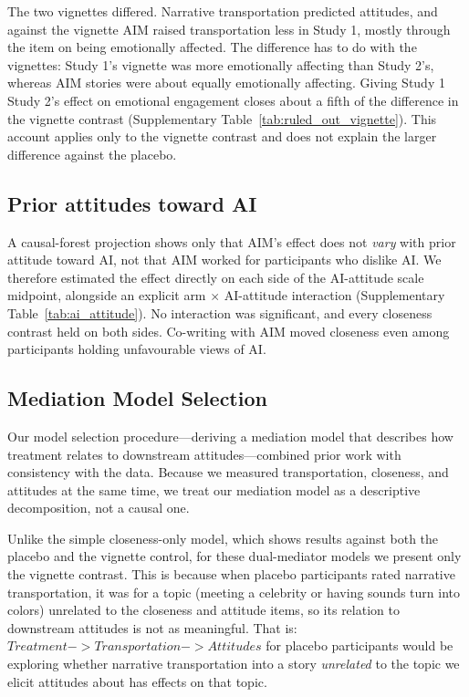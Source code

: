 \documentclass[11pt]{article}
\begin{document}
The two vignettes differed. Narrative transportation predicted attitudes, and against the vignette AIM raised transportation less in Study 1, mostly through the item on being emotionally affected. The difference has to do with the vignettes: Study 1's vignette was more emotionally affecting than Study 2's, whereas AIM stories were about equally emotionally affecting. Giving Study 1 Study 2's effect on emotional engagement closes about a fifth of the difference in the vignette contrast (Supplementary Table~\ref{tab:ruled_out_vignette}). This account applies only to the vignette contrast and does not explain the larger difference against the placebo.

{\footnotesize

}

\subsection{Prior attitudes toward AI}
\label{sec:si-ai-attitudes}

A causal-forest projection shows only that AIM's effect does not \emph{vary} with prior attitude toward AI, not that AIM worked for participants who dislike AI. We therefore estimated the effect directly on each side of the AI-attitude scale midpoint, alongside an explicit arm $\times$ AI-attitude interaction (Supplementary Table~\ref{tab:ai_attitude}). No interaction was significant, and every closeness contrast held on both sides. Co-writing with AIM moved closeness even among participants holding unfavourable views of AI.

{\footnotesize

}

\subsection{Mediation Model Selection}
\label{sec:si-mediation-model-selection}

Our model selection procedure---deriving a mediation model that describes how treatment relates to downstream attitudes---combined prior work with consistency with the data. Because we measured transportation, closeness, and attitudes at the same time, we treat our mediation model as a descriptive decomposition, not a causal one.


Unlike the simple closeness-only model, which shows results against both the placebo and the vignette control, for these dual-mediator models we present only the vignette contrast. This is because when placebo participants rated narrative transportation, it was for a topic (meeting a celebrity or having sounds turn into colors) unrelated to the closeness and attitude items, so its relation to downstream attitudes is not as meaningful. That is: $Treatment -> Transportation -> Attitudes$ for placebo participants would be exploring whether narrative transportation into a story \textit{unrelated} to the topic we elicit attitudes about has effects on that topic.
\end{document}
